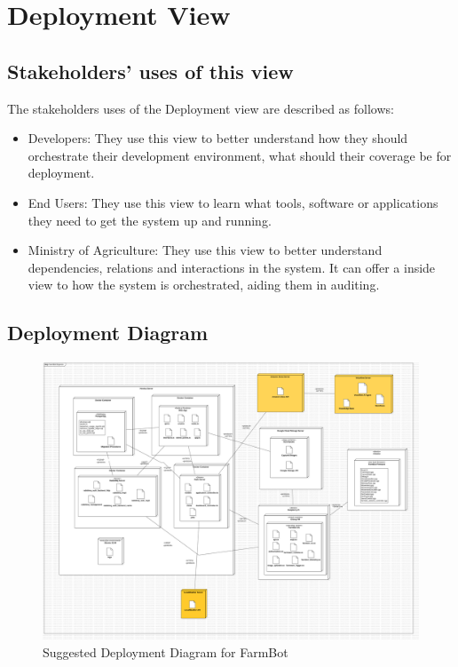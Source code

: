 \section{Deployment View}


\subsection{Stakeholders’ uses of this view}

The stakeholders uses of the Deployment view are described as follows:
\begin{itemize}
    \item Developers: They use this view to better understand how they should orchestrate their development environment, what should their coverage be for deployment.
    \item End Users: They use this view to learn what tools, software or applications they need to get the system up and running.
    \item Ministry of Agriculture: They use this view to better understand dependencies, relations and interactions in the system. It can offer a inside view to how the system is orchestrated, aiding them in auditing.
\end{itemize}


\subsection{Deployment Diagram}

\begin{figure}[H]
    \centering
    \includegraphics[width=1\textwidth]{Figures/DeploymentDiagramSuggestions.png}
    \caption{Suggested Deployment Diagram for FarmBot}\label{fig:deployment_diagram_suggestions}
\end{figure}

